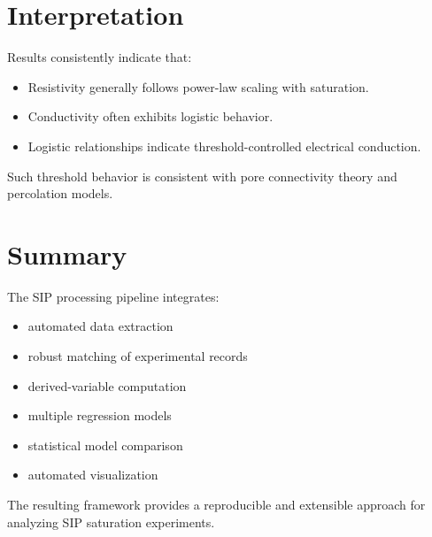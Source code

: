 \documentclass[11pt]{article}
\begin{document}
\section{Interpretation}

Results consistently indicate that:

\begin{itemize}

\item Resistivity generally follows power-law scaling with saturation.

\item Conductivity often exhibits logistic behavior.

\item Logistic relationships indicate threshold-controlled electrical conduction.

\end{itemize}

Such threshold behavior is consistent with pore connectivity theory and percolation models.

\section{Summary}

The SIP processing pipeline integrates:

\begin{itemize}

\item automated data extraction
\item robust matching of experimental records
\item derived-variable computation
\item multiple regression models
\item statistical model comparison
\item automated visualization

\end{itemize}

The resulting framework provides a reproducible and extensible approach for analyzing SIP saturation experiments.
\end{document}
